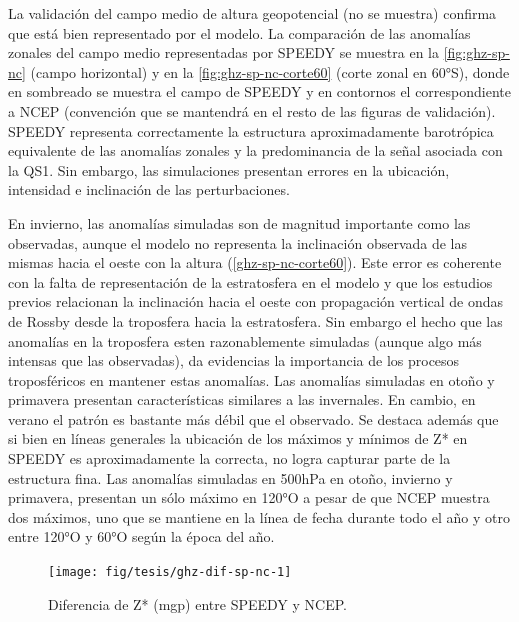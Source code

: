 \documentclass[spanish,a4paper,12pt,oneside]{book}
\begin{document}
La validación del campo medio de altura geopotencial (no se muestra)
confirma que está bien representado por el modelo. La comparación de las
anomalías zonales del campo medio representadas por SPEEDY se muestra en
la \autoref{fig:ghz-sp-nc} (campo horizontal) y en la
\autoref{fig:ghz-sp-nc-corte60} (corte zonal en 60°S), donde en
sombreado se muestra el campo de SPEEDY y en contornos el
correspondiente a NCEP (convención que se mantendrá en el resto de las
figuras de validación). SPEEDY representa correctamente la estructura
aproximadamente barotrópica equivalente de las anomalías zonales y la
predominancia de la señal asociada con la QS1. Sin embargo, las
simulaciones presentan errores en la ubicación, intensidad e inclinación
de las perturbaciones.

En invierno, las anomalías simuladas son de magnitud importante como las
observadas, aunque el modelo no representa la inclinación observada de
las mismas hacia el oeste con la altura (\autoref{ghz-sp-nc-corte60}).
Este error es coherente con la falta de representación de la
estratosfera en el modelo y que los estudios previos relacionan la
inclinación hacia el oeste con propagación vertical de ondas de Rossby
desde la troposfera hacia la estratosfera. Sin embargo el hecho que las
anomalías en la troposfera esten razonablemente simuladas (aunque algo
más intensas que las observadas), da evidencias la importancia de los
procesos troposféricos en mantener estas anomalías. Las anomalías
simuladas en otoño y primavera presentan características similares a las
invernales. En cambio, en verano el patrón es bastante más débil que el
observado. Se destaca además que si bien en líneas generales la
ubicación de los máximos y mínimos de Z* en SPEEDY es aproximadamente la
correcta, no logra capturar parte de la estructura fina. Las anomalías
simuladas en 500hPa en otoño, invierno y primavera, presentan un sólo
máximo en 120°O a pesar de que NCEP muestra dos máximos, uno que se
mantiene en la línea de fecha durante todo el año y otro entre 120°O y
60°O según la época del año.

\begin{landscape}\begin{figure}

{\centering \texttt{[image: fig/tesis/ghz-dif-sp-nc-1]} 

}

\caption{Diferencia de Z* (mgp) entre SPEEDY y NCEP.}\label{fig:ghz-dif-sp-nc}
\end{figure}
\end{landscape}
\end{document}
